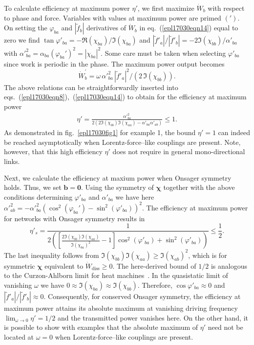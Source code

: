 \documentclass[doublecol,final,edchoice]{epl2}
\begin{document}
To calculate efficiency at maximum power $\eta'$, we first maximize $\dot{W}_b$ with respect to phase and force. Variables with values at maximum power are primed $(')$. On setting the $\varphi_{ba}$ and $|\tilde{f}_b|$ derivatives of $\dot{W}_b$ in eq.~(\ref{epl17030eqn14}) equal to zero we find $\tan{\varphi'_{ba}} = -\Re{(\chi_{ba})}/\Im{(\chi_{ba})}$ and $|\tilde{f}'_a|/|\tilde{f}'_b| = -2 \Im{(\chi_{bb})}/{\alpha'_{ba}}$ with ${\alpha'}^{2}_{ba}=\alpha_{ba}(\varphi_{ba}')^2 = |\chi_{ba}|^2$. Some care must be taken when selecting $\varphi'_{ba}$ since work is periodic in the phase. The maximum power output becomes
\begin{equation}%
\dot{W}_b^{\prime} = \omega\,{\alpha'}^2_{ba}\,|\tilde{f}'_a|^2/(2\,\Im{(\chi_{bb})}).
\label{epl17030eqn16}
\end{equation}
The above relations can be straightforwardly inserted into eqs.~(\ref{epl17030eqn8}),~(\ref{epl17030eqn14}) to obtain for the efficiency at maximum power
\begin{align}%
\eta' = \frac{{\alpha'}^2_{ba}}{2 \left( 2\Im(\chi_{bb})\Im(\chi_{aa}) - \alpha'_{ba} \alpha'_{ab}\right)} \leq 1.
\label{epl17030eqn17}
\end{align}
As demonstrated in fig.~\ref{epl17030fig1} for example 1, the bound $\eta'=1$ can indeed be reached asymptotically when Lorentz-force--like couplings are present. Note, however, that this high efficiency $\eta'$ does not require in general mono-directional links.

Next, we calculate the efficiency at maxium power when Onsager symmetry holds. Thus, we set $\mathbf{b}=\mathbf{0}$. Using the symmetry of $\bm{\chi}$ together with the above conditions determining $\varphi'_{ba}$ and $\alpha'_{ba}$ we have here ${\alpha'}_{ab}^{2} = -{\alpha'}_{ba}^{2}(\cos^2(\varphi_{ba}')-\sin^2(\varphi'_{ba}))^2$. The efficiency at maximum power for networks with Onsager symmetry results in
\begin{equation}%
\eta'_{s} = \frac{1}{2\left([\frac{2\Im(\chi_{bb})\Im(\chi_{aa})}{\Im(\chi_{ba})^2}-1]\cos^2(\varphi'_{ba}) + \sin^2(\varphi'_{ba})\right)} \leq \frac{1}{2}.
\label{epl17030eqn18}
\end{equation}
The last inequality follows from $\Im(\chi_{bb})\Im(\chi_{aa})\geq\Im(\chi_{ab})^2$, which is for symmetric $\bm{\chi}$ equivalent to $\dot{W}_{\text{diss}} \geq 0$. The here-derived bound of $1/2$ is analogous to the Curzon-Ahlborn limit for heat machines~\cite{epl17030bib16,epl17030bib18,epl17030bib19}. In the quasistatic limit of vanishing $\omega$ we have $0\approx\Im{(\chi_{ba})} \approx \Im{(\chi_{bb})}$. Therefore, $\cos{\varphi'_{ba}} \approx 0$ and $|\tilde{f}'_a|/|\tilde{f}'_b| \approx 0$. Consequently, for conserved Onsager symmetry, the efficiency at maximum power attains its absolute maximum at vanishing driving frequency $\lim_{\omega\rightarrow 0}\eta' = 1/2$ and the transmitted power vanishes here. On the other hand, it is possible to show with examples that the absolute maximum of $\eta'$ need not be located at $\omega=0$ when Lorentz-force--like couplings are present.
\end{document}
